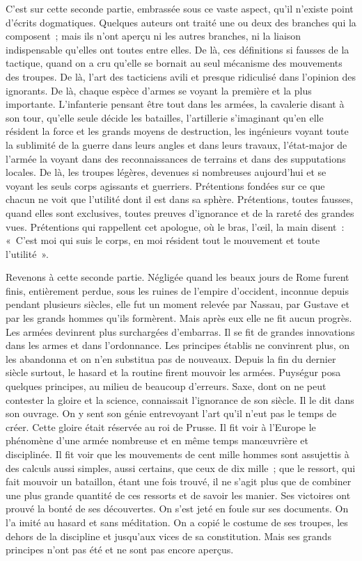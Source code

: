 \documentclass[french,twoside]{book} %
\begin{document}
C’est sur cette seconde partie, embrassée sous ce vaste aspect, qu’il n’existe point d’écrits dogmatiques. Quelques auteurs ont traité une ou deux des branches qui la composent ; mais ils n’ont aperçu ni les autres branches, ni la liaison indispensable qu’elles ont toutes entre elles. De là, ces définitions si fausses de la tactique, quand on a cru qu’elle se bornait au seul mécanisme des mouvements des troupes. De là, l’art des tacticiens avili et presque ridiculisé dans l’opinion des ignorants. De là, chaque espèce d’armes se voyant la première et la plus importante. L’infanterie pensant être tout dans les armées, la cavalerie disant à son tour, qu’elle seule décide les batailles, l’artillerie s’imaginant qu’en elle résident la force et les grands moyens de destruction, les ingénieurs voyant toute la sublimité de la guerre dans leurs angles et dans leurs travaux, l’état-major de l’armée la voyant dans des reconnaissances de terrains et dans des supputations locales. De là, les troupes légères, devenues si nombreuses aujourd’hui et se voyant les seuls corps agissants et guerriers. Prétentions fondées sur ce que chacun ne voit que l’utilité dont il est dans sa sphère. Prétentions, toutes fausses, quand elles sont exclusives, toutes preuves d’ignorance et de la rareté des grandes vues. Prétentions qui rappellent cet apologue, où le bras, l’œil, la main disent : « C’est moi qui suis le corps, en moi résident tout le mouvement et toute l’utilité ».\par
Revenons à cette seconde partie. Négligée quand les beaux jours de Rome furent finis, entièrement perdue, sous les ruines de l’empire d’occident, inconnue depuis pendant plusieurs siècles, elle fut un moment relevée par Nassau, par Gustave et par les grands hommes qu’ils formèrent. Mais après eux elle ne fit aucun progrès. Les armées devinrent plus surchargées d’embarras. Il se fit de grandes innovations dans les armes et dans l’ordonnance. Les principes établis ne convinrent plus, on les abandonna et on n’en substitua pas de nouveaux. Depuis la fin du dernier siècle surtout, le hasard et la routine firent mouvoir les armées. Puységur posa quelques principes, au milieu de beaucoup d’erreurs. Saxe, dont on ne peut contester la gloire et la science, connaissait l’ignorance de son siècle. Il le dit dans son ouvrage. On y sent son génie entrevoyant l’art qu’il n’eut pas le temps de créer. Cette gloire était réservée au roi de Prusse. Il fit voir à l’Europe le phénomène d’une armée nombreuse et en même temps manœuvrière et disciplinée. Il fit voir que les mouvements de cent mille hommes sont assujettis à des calculs aussi simples, aussi certains, que ceux de dix mille ; que le ressort, qui fait mouvoir un bataillon, étant une fois trouvé, il ne s’agit plus que de combiner une plus grande quantité de ces ressorts et de savoir les manier. Ses victoires ont prouvé la bonté de ses découvertes. On s’est jeté en foule sur ses documents. On l’a imité au hasard et sans méditation. On a copié le costume de ses troupes, les dehors de la discipline et jusqu’aux vices de sa constitution. Mais ses grands principes n’ont pas été et ne sont pas encore aperçus.\par
\end{document}

